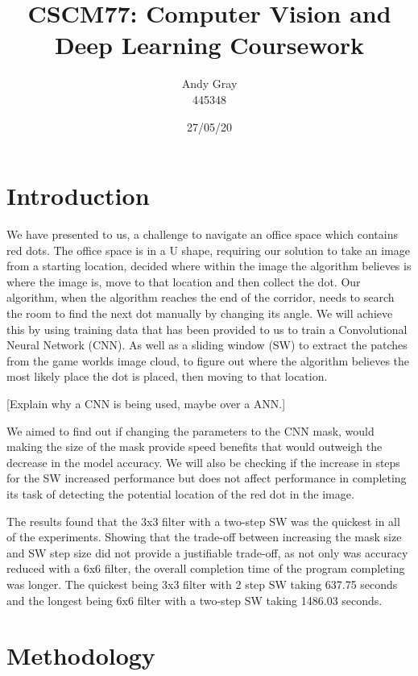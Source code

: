 \documentclass[a4paper,10pt]{article}
\begin{document}
\title{\textbf{CSCM77: Computer Vision and Deep Learning Coursework}}
\date{27/05/20}
\author{Andy Gray\\445348}

\maketitle

\thispagestyle{empty}
\newpage
{}

\section{Introduction}

\small 
We have presented to us, a challenge to navigate an office space which contains red dots. The office space is in a U shape, requiring our solution to take an image from a starting location, decided where within the image the algorithm believes is where the image is, move to that location and then collect the dot. Our algorithm, when the algorithm reaches the end of the corridor, needs to search the room to find the next dot manually by changing its angle. We will achieve this by using training data that has been provided to us to train a Convolutional Neural Network (CNN). As well as a sliding window (SW) to extract the patches from the game worlds image cloud, to figure out where the algorithm believes the most likely place the dot is placed, then moving to that location.

[Explain why a CNN is being used, maybe over a ANN.]

We aimed to find out if changing the parameters to the CNN mask, would making the size of the mask provide speed benefits that would outweigh the decrease in the model accuracy. We will also be checking if the increase in steps for the SW increased performance but does not affect performance in completing its task of detecting the potential location of the red dot in the image.

The results found that the 3x3 filter with a two-step SW was the quickest in all of the experiments. Showing that the trade-off between increasing the mask size and SW step size did not provide a justifiable trade-off, as not only was accuracy reduced with a 6x6 filter, the overall completion time of the program completing was longer. The quickest being 3x3 filter with 2 step SW taking 637.75 seconds and the longest being 6x6 filter with a two-step SW taking 1486.03 seconds.  

\section{Methodology}
\end{document}
